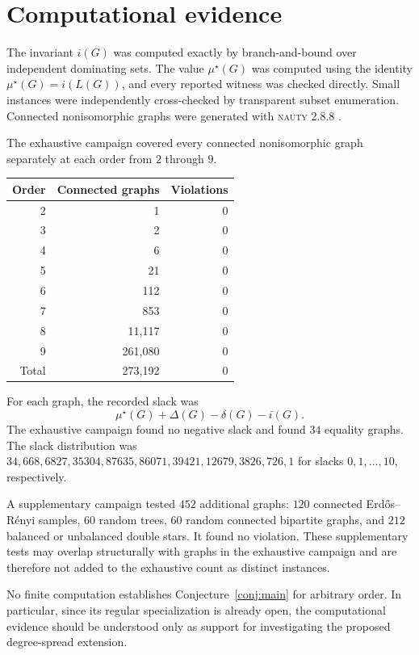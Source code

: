 \documentclass[11pt]{article}
\newcommand{\mustar}{\mu^{\star}}
\begin{document}
\section{Computational evidence}
The invariant $i(G)$ was computed exactly by branch-and-bound over independent dominating sets. The value $\mustar(G)$ was computed using the identity $\mustar(G)=i(L(G))$, and every reported witness was checked directly. Small instances were independently cross-checked by transparent subset enumeration. Connected nonisomorphic graphs were generated with \textsc{nauty} 2.8.8 \cite{mckay2014}.

The exhaustive campaign covered every connected nonisomorphic graph separately at each order from $2$ through $9$.

\begin{center}
\begin{tabular}{rrr}
\toprule
Order & Connected graphs & Violations \\
\midrule
2 & 1 & 0 \\
3 & 2 & 0 \\
4 & 6 & 0 \\
5 & 21 & 0 \\
6 & 112 & 0 \\
7 & 853 & 0 \\
8 & 11,117 & 0 \\
9 & 261,080 & 0 \\
\midrule
Total & 273,192 & 0 \\
\bottomrule
\end{tabular}
\end{center}

For each graph, the recorded slack was
\[
 \mustar(G)+\Delta(G)-\delta(G)-i(G).
\]
The exhaustive campaign found no negative slack and found $34$ equality graphs. The slack distribution was $34,668,6827,35304,87635,86071,39421,12679,3826,726,1$ for slacks $0,1,\ldots,10$, respectively.

A supplementary campaign tested $452$ additional graphs: $120$ connected Erd\H{o}s--R\'enyi samples, $60$ random trees, $60$ random connected bipartite graphs, and $212$ balanced or unbalanced double stars. It found no violation. These supplementary tests may overlap structurally with graphs in the exhaustive campaign and are therefore not added to the exhaustive count as distinct instances.

No finite computation establishes Conjecture~\ref{conj:main} for arbitrary order. In particular, since its regular specialization is already open, the computational evidence should be understood only as support for investigating the proposed degree-spread extension.
\end{document}

